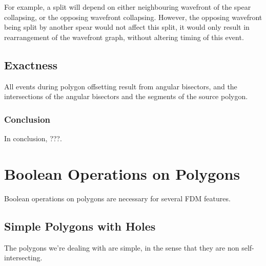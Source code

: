 \documentclass[12pt,a4paper,oneside,openany]{article}
\begin{document}
For example, a split will depend on either neighbouring wavefront of the spear collapsing, or the opposing wavefront collapsing. However, the opposing wavefront being split by another spear would not affect this split, it would only result in rearrangement of the wavefront graph, without altering timing of this event.



\subsection{Exactness}

All events during polygon offsetting result from angular bisectors, and the intersections of the angular bisectors and the segments of the source polygon.

\subsubsection{Conclusion}

In conclusion, ???.

\section{Boolean Operations on Polygons}

Boolean operations on polygons are necessary for several FDM features.

\subsection{Simple Polygons with Holes}

The polygons we're dealing with are simple, in the sense that they are non self-intersecting.



\nocite{*}



\end{document}

